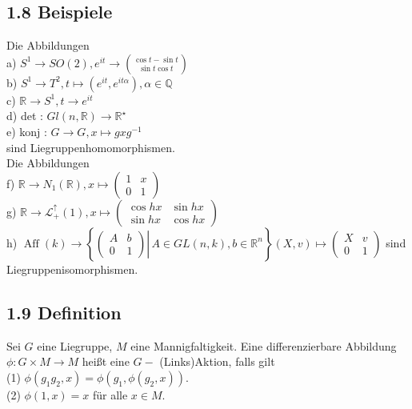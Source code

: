 \documentclass[10pt, letterpaper]{article}
\begin{document}
\subsection*{1.8 Beispiele}
Die Abbildungen\\
a) $S^{1} \rightarrow S O(2), e^{i t} \rightarrow\binom{\cos t-\sin t}{\sin t \cos t}$\\
b) $S^{1} \rightarrow T^{2}, t \mapsto\left(e^{i t}, e^{i t \alpha}\right), \alpha \in \mathbb{Q}$\\
c) $\mathbb{R} \rightarrow S^{1}, t \rightarrow e^{i t}$\\
d) det : $G l(n, \mathbb{R}) \rightarrow \mathbb{R}^{\star}$\\
e) konj : $G \rightarrow G, x \mapsto g x g^{-1}$\\
sind Liegruppenhomomorphismen.\\
Die Abbildungen\\
f) $\mathbb{R} \rightarrow N_{1}(\mathbb{R}), x \mapsto\left(\begin{array}{ll}1 & x \\ 0 & 1\end{array}\right)$\\
g) $\mathbb{R} \rightarrow \mathcal{L}_{+}^{\uparrow}(1), x \mapsto\left(\begin{array}{cc}\cos h x & \sin h x \\ \sin h x & \cos h x\end{array}\right)$\\
h) $\operatorname{Aff}(k) \rightarrow\left\{\left.\left(\begin{array}{cc}A & b \\ 0 & 1\end{array}\right) \right\rvert\, A \in G L(n, k), b \in \mathbb{R}^{n}\right\}(X, v) \mapsto\left(\begin{array}{cc}X & v \\ 0 & 1\end{array}\right)$ sind Liegruppenisomorphismen.

\subsection*{1.9 Definition}
Sei $G$ eine Liegruppe, $M$ eine Mannigfaltigkeit. Eine differenzierbare Abbildung $\phi: G \times M \rightarrow M$ heißt eine $G-$ (Links)Aktion, falls gilt\\
(1) $\phi\left(g_{1} g_{2}, x\right)=\phi\left(g_{1}, \phi\left(g_{2}, x\right)\right)$.\\
(2) $\phi(1, x)=x$ für alle $x \in M$.
\end{document}
